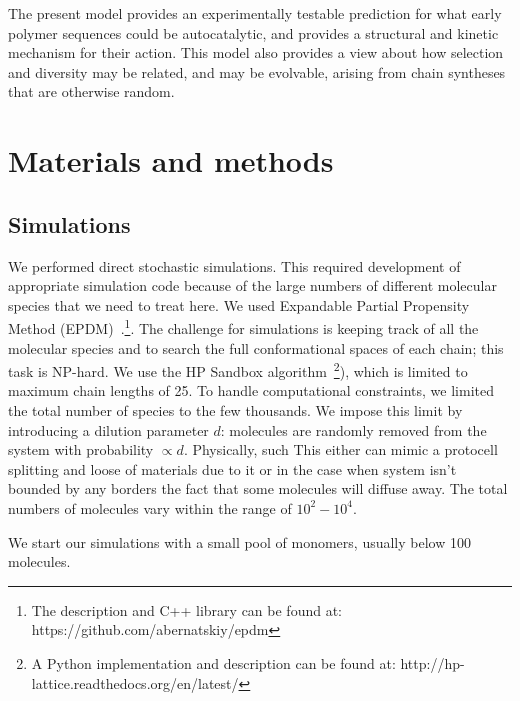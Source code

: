 \documentclass[journal=jacsat,manuscript=article,layout=twocolumn]{achemso}
\begin{document}
  The present model provides an experimentally testable prediction for what early 
  polymer sequences could be autocatalytic, and provides a structural and kinetic mechanism for 
their action.  This model also provides a view about how selection and diversity may be related, 
and may be evolvable, arising from chain syntheses that are otherwise random.



\section{Materials and methods}\label{sec:mat}
\subsection{Simulations}\label{sec:mat-sim}
We performed direct stochastic simulations.  This required development of appropriate simulation 
code because of the large numbers of different molecular species that we need to treat here.  We 
used Expandable Partial Propensity Method (EPDM)~\cite{Guseva2016b}.\footnote{The description and 
C++ library can be found at: https://github.com/abernatskiy/epdm}. The challenge for simulations is 
keeping track of all the molecular species and to search the full conformational spaces of each 
chain; this task is NP-hard.  We use the HP Sandbox 
algorithm~\cite{lau1989lattice,Dill2008}\footnote{A Python implementation and description can be 
found at: http://hp-lattice.readthedocs.org/en/latest/}), which is limited to maximum chain lengths 
of 25.  To handle computational constraints, we limited the total number of species to the few 
thousands.  We impose this limit by introducing a dilution parameter $d$: molecules are randomly 
removed from the system with probability $\propto d$.  Physically, such This either can mimic a 
protocell splitting and loose of materials due to it or in the case when system isn't bounded by any 
borders the fact that some molecules will diffuse away. The total numbers of molecules vary within 
the range of $10^2-10^4$.

We start our simulations with a small pool of monomers, usually below 100 molecules. 
\end{document}
